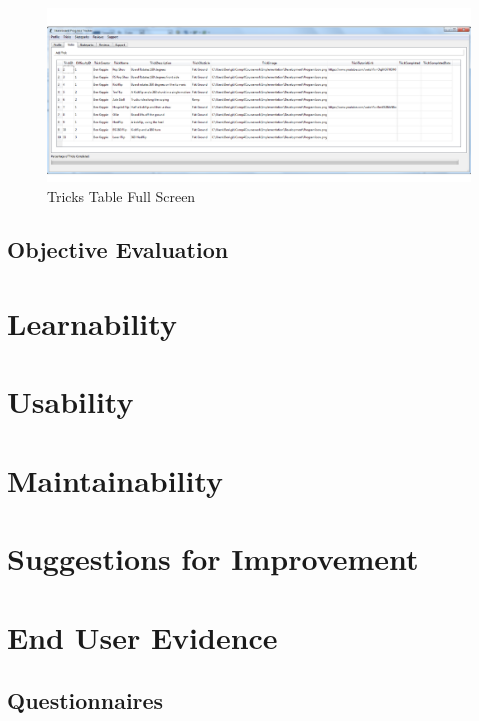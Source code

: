 \begin{itemize}
\begin{figure}[H]
    \includegraphics[width=\textwidth]{./Evaluation/images/TricksTableFS.pdf}
    \caption{Tricks Table Full Screen} \label{fig:TricksTableFS}
\end{figure} %

\subsection{Objective Evaluation}

\section{Learnability}

\section{Usability}

\section{Maintainability}

\section{Suggestions for Improvement} %

\section{End User Evidence}

\subsection{Questionnaires} \label{QSub}


\end{itemize}
